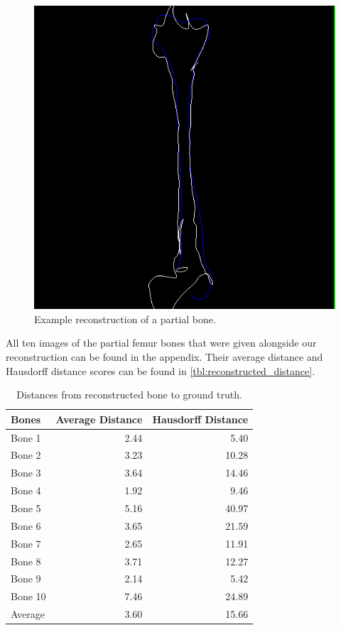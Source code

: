 \begin{figure}
	\centering
  \includegraphics[scale=0.7]{./Figures/reconstructed_bone}
  \caption{Example reconstruction of a partial bone.}
  \label{fig:reconstructed_bone}
\end{figure}

All ten images of the partial femur bones that were given alongside our reconstruction can be found in the appendix. 
Their average distance and Hausdorff distance scores can be found in \autoref{tbl:reconstructed_distance}.

\begin{table}
\centering
\caption{Distances from reconstructed bone to ground truth.}
\label{tbl:reconstructed_distance}
\begin{tabular}{lrr}
\toprule
\textbf{Bones} &
Average Distance &
Hausdorff Distance \\
\midrule
Bone 1& 2.44 & 5.40 \\
Bone 2& 3.23 & 10.28 \\
Bone 3& 3.64 & 14.46 \\
Bone 4& 1.92 & 9.46 \\
Bone 5& 5.16 & 40.97 \\
Bone 6& 3.65 & 21.59 \\
Bone 7& 2.65 & 11.91 \\
Bone 8& 3.71 & 12.27 \\
Bone 9& 2.14 & 5.42 \\
Bone 10& 7.46 & 24.89 \\
\midrule
Average & 3.60 & 15.66 \\
\bottomrule
\end{tabular}
\end{table}